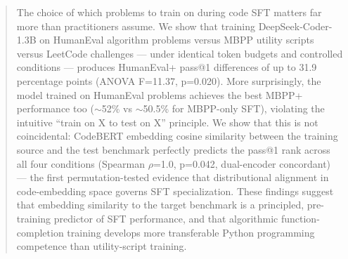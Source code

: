 \begin{abstract}
The choice of which problems to train on during code SFT matters far more than practitioners
assume. We show that training DeepSeek-Coder-1.3B on HumanEval algorithm problems versus MBPP
utility scripts versus LeetCode challenges --- under identical token budgets and controlled
conditions --- produces HumanEval+ pass@1 differences of up to 31.9 percentage points (ANOVA
F=11.37, p=0.020). More surprisingly, the model trained on HumanEval problems achieves the
best MBPP+ performance too ($\sim$52\% vs $\sim$50.5\% for MBPP-only SFT), violating the intuitive
``train on X to test on X'' principle. We show that this is not coincidental: CodeBERT
embedding cosine similarity between the training source and the test benchmark perfectly
predicts the pass@1 rank across all four conditions (Spearman $\rho$=1.0, p=0.042,
dual-encoder concordant) --- the first permutation-tested evidence that distributional alignment
in code-embedding space governs SFT specialization. These findings suggest that embedding
similarity to the target benchmark is a principled, pre-training predictor of SFT performance,
and that algorithmic function-completion training develops more transferable Python programming
competence than utility-script training.
\end{abstract}
